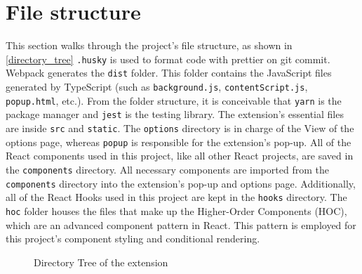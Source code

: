 \section{File structure}
This section walks through the project's file structure, as shown in \autoref{directory_tree} \texttt{.husky} is used to format code with prettier on git commit. Webpack generates the \texttt{dist} folder. This folder contains the JavaScript files generated by TypeScript (such as \texttt{background.js}, \texttt{contentScript.js}, \texttt{popup.html}, etc.). From the folder structure, it is conceivable that \texttt{yarn} is the package manager and \texttt{jest} is the testing library. The extension's essential files are inside \texttt{src} and \texttt{static}. The \texttt{options} directory is in charge of the View of the options page, whereas \texttt{popup} is responsible for the extension's pop-up. All of the React components used in this project, like all other React projects, are saved in the \texttt{components} directory. All necessary components are imported from the \texttt{components} directory into the extension's pop-up and options page. Additionally, all of the React Hooks used in this project are kept in the \texttt{hooks} directory. The \texttt{hoc} folder houses the files that make up the Higher-Order Components (HOC), which are an advanced component pattern in React. This pattern is employed for this project's component styling and conditional rendering.

\begin{figure}[H]
  \caption{Directory Tree of the extension}
  \label{directory_tree}
\end{figure}

